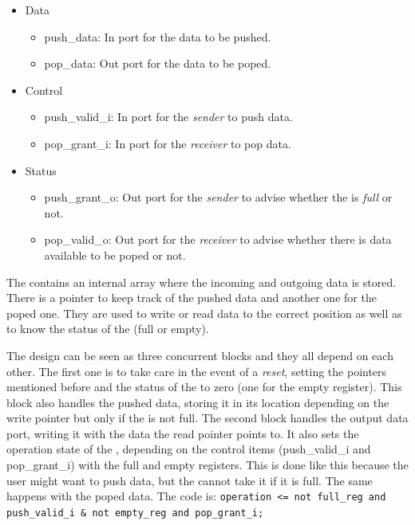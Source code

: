 \documentclass[12pt]{article}
\begin{document}
\begin{itemize}
	\item Data
	\begin{itemize}
		\item push\_data: In port for the data to be pushed.
		\item pop\_data: Out port for the data to be poped.
	\end{itemize}
	\item Control
	\begin{itemize}
		\item push\_valid\_i: In port for the \textit{sender} to push data.
		\item pop\_grant\_i: In port for the \textit{receiver} to pop data.
	\end{itemize}
	\item Status
	\begin{itemize}
		\item push\_grant\_o: Out port for the \textit{sender} to advise whether the \fifo is \textit{full} or not.
		\item pop\_valid\_o: Out port for the \textit{receiver} to advise whether there is data available to be poped or not.
	\end{itemize}
\end{itemize}

The \fifo contains an internal array where the incoming and outgoing data is stored.  There is a pointer to keep track of the pushed data and another one for the poped one.  They are used to write or read data to the correct position as well as to know the status of the \fifo (full or empty).

The design can be seen as three concurrent blocks and they all depend on each other.  The first one is to take care in the event of a \textit{reset}, setting the pointers mentioned before and the status of the \fifo to zero (one for the empty register).  This block also handles the pushed data, storing it in its location depending on the write pointer but only if the \fifo is not full.  The second block handles the output data port, writing it with the data the read pointer points to.  It also sets the operation state of the \fifo, depending on the control items (push\_valid\_i and pop\_grant\_i) with the full and empty registers.  This is done like this because the user might want to push data, but the \fifo cannot take it if it is full.  The same happens with the poped data.  The \vhdl code is: \texttt{operation <= not full\_reg and push\_valid\_i \& not empty\_reg and pop\_grant\_i;}
\end{document}
